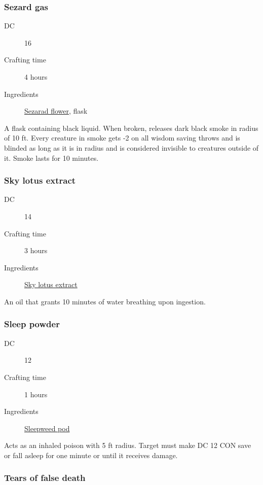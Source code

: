 \subsubsection{Sezard gas}
\label{Sezard gas}

\begin{description}
\item [DC] 16
\item [Crafting time] 4 hours
\item [Ingredients] \hyperref[Sezarad]{Sezarad flower}, flask
\end{description}

A flask containing black liquid. When broken, releases dark black smoke in radius of 10 ft. 
Every creature in smoke gets -2 on all wisdom saving throws and is blinded as long as it is in radius 
and is considered invisible to creatures outside of it. Smoke lasts for 10 minutes.

\subsubsection{Sky lotus extract}
\label{Sky lotus extract}

\begin{description}
\item [DC] 14
\item [Crafting time] 3 hours
\item [Ingredients] \hyperref[Sky lotus]{Sky lotus extract}
\end{description}

An oil that grants 10 minutes of water breathing upon ingestion.

\subsubsection{Sleep powder}
\label{Sleep powder}

\begin{description}
\item [DC] 12
\item [Crafting time] 1 hours
\item [Ingredients] \hyperref[Sleepweed]{Sleepweed pod}
\end{description}

Acts as an inhaled poison with 5 ft radius. Target must make DC 12 CON save or 
fall asleep for one minute or until it receives damage.

\subsubsection{Tears of false death}
\label{Tears of false death}

